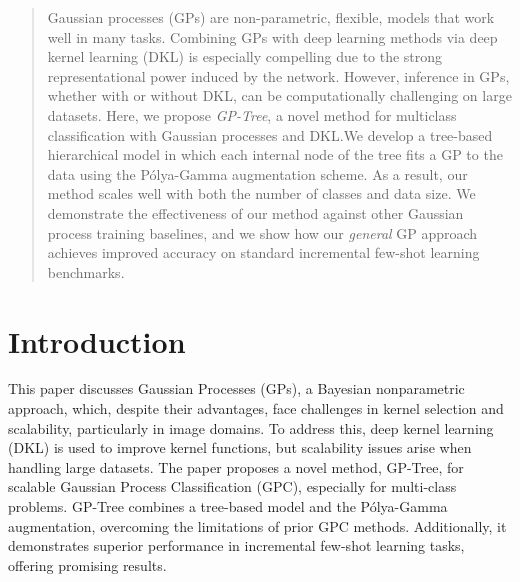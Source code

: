 \documentclass[preprint,11pt]{elsarticle}
\begin{document}
\date{\today}


\begin{abstract}
\label{abs}
Gaussian processes (GPs) are non-parametric,
flexible, models that work well in many tasks.
Combining GPs with deep learning methods via
deep kernel learning (DKL) is especially compelling
due to the strong representational power
induced by the network. However, inference in
GPs, whether with or without DKL, can be computationally
challenging on large datasets. Here,
we propose \textit{GP-Tree}, a novel method for multiclass
classification with Gaussian processes and
DKL.We develop a tree-based hierarchical model
in which each internal node of the tree fits a GP
to the data using the Pólya-Gamma augmentation
scheme. As a result, our method scales
well with both the number of classes and data
size. We demonstrate the effectiveness of our
method against other Gaussian process training
baselines, and we show how our \textit{general} GP approach
achieves improved accuracy on standard
incremental few-shot learning benchmarks.
\end{abstract}

\maketitle

\section{Introduction}
\label{sec:1}
This paper discusses Gaussian Processes (GPs), a Bayesian nonparametric approach, which, despite their advantages, face challenges in kernel selection and scalability, particularly in image domains. To address this, deep kernel learning (DKL) is used to improve kernel functions, but scalability issues arise when handling large datasets. The paper proposes a novel method, GP-Tree, for scalable Gaussian Process Classification (GPC), especially for multi-class problems. GP-Tree combines a tree-based model and the Pólya-Gamma augmentation, overcoming the limitations of prior GPC methods. Additionally, it demonstrates superior performance in incremental few-shot learning tasks, offering promising results.
\end{document}
